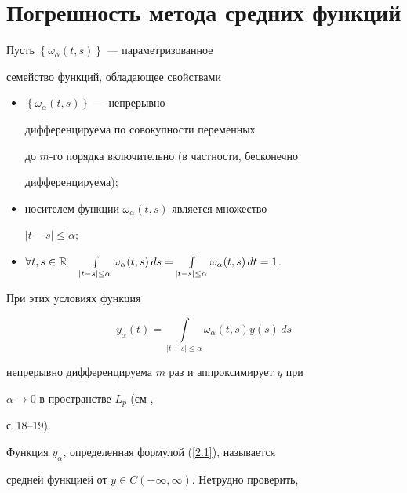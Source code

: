 \section{Погрешность метода средних функций}





Пусть $\left\{\omega_\alpha(t,s)\right\}$ --- параметризованное


семейство функций, обладающее свойствами


\begin{itemize}


\item[1.] $\left\{\omega_\alpha(t,s)\right\}$ --- непрерывно


дифференцируема по совокупности переменных


до $m$-го порядка включительно (в частности, бесконечно


дифференцируема);\label{n1}


\item[2.] носителем функции $\omega_\alpha(t,s)$ является множество


$|t-s|\leq\alpha$;\label{n2}


\item[3.] {$\forall t,s\in \Bbb{R}


\quad\int\limits_{|t-s|\leq\alpha}\omega_\alpha(t,s)\,d s=


\int\limits_{|t-s|\leq\alpha}\omega_\alpha(t,s)\,d


t=1$.}\label{n3}


\end{itemize}


При этих условиях функция


\begin{equation}\label{2.1}


y_\alpha(t)=\int\limits_{|t-s|\leq\alpha}\omega_\alpha(t,s)y(s)\,d s


\end{equation}


непрерывно дифференцируема $m$ раз и аппроксимирует $y$ при


$\alpha\rightarrow 0$ в пространстве $L_p$ (см \cite{Sob},


с.\,18--19).





Функция $y_\alpha$, определенная формулой (\ref{2.1}), называется


средней функцией от $y\in C(-\infty,\infty)$. Нетрудно проверить,


